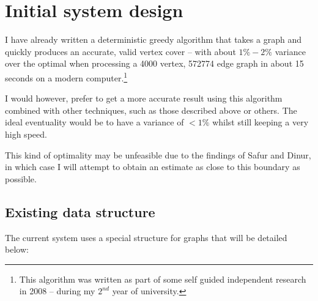 \documentclass[11pt]{article}
\theoremstyle{definition}
\begin{document}
  
  \section{Initial system design}

    I have already written a deterministic greedy algorithm that takes a graph and quickly produces
    an accurate, valid vertex cover -- with about $1\%-2\%$ variance over the optimal when processing a
    4000 vertex, 572774 edge graph in about 15 seconds on a modern computer.\footnote{This algorithm was written as part
    of some self guided independent research in 2008 -- during my $2^{nd}$ year of university.}

    I would however, prefer to get a more accurate result using this algorithm combined with other techniques, such as
    those described above or others. The ideal eventuality would be to have a variance of $<1\%$ whilst still keeping a
    very high speed.

    This kind of optimality may be unfeasible due to the findings of Safur and Dinur, in which case I will attempt to
    obtain an estimate as close to this boundary as possible. 

    \subsection{Existing data structure}

      The current system uses a special structure for graphs that will be detailed below:
 
\end{document}
